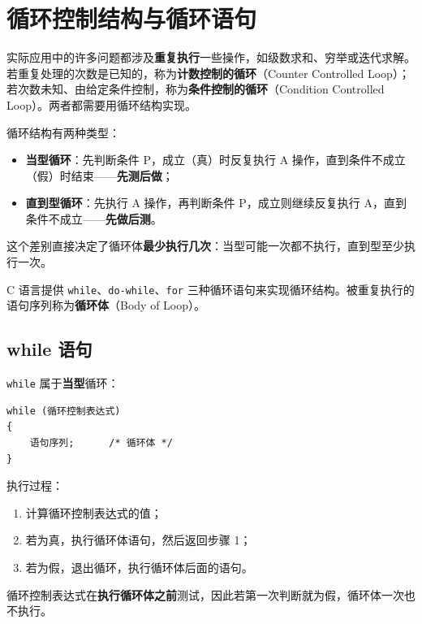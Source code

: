 \lstset{language=C}

\section{循环控制结构与循环语句}

实际应用中的许多问题都涉及\textbf{重复执行}一些操作，如级数求和、穷举或迭代求解。若重复处理的次数是已知的，称为\textbf{计数控制的循环}（Counter Controlled Loop）；若次数未知、由给定条件控制，称为\textbf{条件控制的循环}（Condition Controlled Loop）。两者都需要用循环结构实现。

循环结构有两种类型：

\begin{itemize}
  \item \textbf{当型循环}：先判断条件 P，成立（真）时反复执行 A 操作，直到条件不成立（假）时结束——\textbf{先测后做}；
  \item \textbf{直到型循环}：先执行 A 操作，再判断条件 P，成立则继续反复执行 A，直到条件不成立——\textbf{先做后测}。
\end{itemize}

这个差别直接决定了循环体\textbf{最少执行几次}：当型可能一次都不执行，直到型至少执行一次。

C 语言提供 \texttt{while}、\texttt{do-while}、\texttt{for} 三种循环语句来实现循环结构。被重复执行的语句序列称为\textbf{循环体}（Body of Loop）。

\subsection{while 语句}

\texttt{while} 属于\textbf{当型}循环：

\begin{lstlisting}
while (循环控制表达式)
{
    语句序列;      /* 循环体 */
}
\end{lstlisting}

执行过程：

\begin{enumerate}
  \item 计算循环控制表达式的值；
  \item 若为真，执行循环体语句，然后返回步骤 1；
  \item 若为假，退出循环，执行循环体后面的语句。
\end{enumerate}

循环控制表达式在\textbf{执行循环体之前}测试，因此若第一次判断就为假，循环体一次也不执行。

